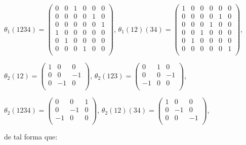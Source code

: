 \documentclass[12pt]{book}
\theoremstyle{definition}
\newcounter{in}
\begin{document}
\begin{center}
  $\theta_{1}(1234)= \left(
    \begin{array}{rrrrrr}
      0 & 0 & 1 & 0 & 0 & 0\\
      0 & 0 & 0 & 0 & 1 & 0\\
      0 & 0 & 0 & 0 & 0 & 1\\
      1 & 0 & 0 & 0 & 0 & 0\\
      0 & 1 & 0 & 0 & 0 & 0\\
      0 & 0 & 0 & 1 & 0 & 0\\
    \end{array} 
  \right)$, \quad
  $\theta_{1}(12)(34)= \left(
    \begin{array}{rrrrrr}
      1 & 0 & 0 & 0 & 0 & 0\\
      0 & 0 & 0 & 0 & 1 & 0\\
      0 & 0 & 0 & 1 & 0 & 0\\
      0 & 0 & 1 & 0 & 0 & 0\\
      0 & 1 & 0 & 0 & 0 & 0\\
      0 & 0 & 0 & 0 & 0 & 1\\
    \end{array} 
  \right)$, 
\end{center}

\begin{center}
  $\theta_{2}(12)= \left(
    \begin{array}{rrr}
      1 & 0 & 0 \\
      0 & 0 & -1 \\
      0 & -1 & 0 \\
    \end{array} 
  \right)$, \quad
  $\theta_{2}(123)= \left(
    \begin{array}{rrr}
      0 & 1 & 0 \\
      0 & 0 & -1 \\
      -1 & 0 & 0 \\
    \end{array} 
  \right)$,
\end{center}

\begin{center}
  $\theta_{2}(1234)= \left(
    \begin{array}{rrr}
      0 & 0 & 1 \\
      0 & -1 & 0 \\
      -1 & 0 & 0 \\
    \end{array} 
  \right)$, \quad
  $\theta_{2}(12)(34)= \left(
    \begin{array}{rrr}
      1 & 0 & 0 \\
      0 & -1& 0 \\
      0 & 0 & -1 \\
    \end{array} 
  \right)$,
\end{center}
de tal forma que:
\end{document}
